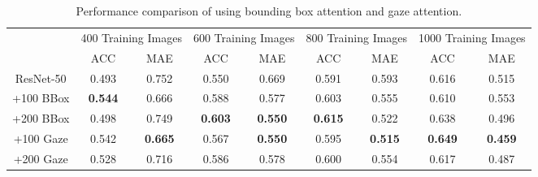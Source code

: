 \begin{table*}[h!]
\caption{Performance comparison of using bounding box attention and gaze attention.}
\label{bbox_table}
\centering
\begin{tabular}{ccccccccc}
\hline
\multirow{2}{*}{} & \multicolumn{2}{c}{400 Training Images}  & \multicolumn{2}{c}{600 Training Images} & \multicolumn{2}{c}{800 Training Images}  & \multicolumn{2}{c}{1000 Training Images} \\ \cline{2-9} 
                        & ACC       & MAE            & ACC       & MAE           & ACC       & MAE            & ACC       & MAE            \\ \hline
ResNet-50               & 0.493          & 0.752          & 0.550          & 0.669         & 0.591          & 0.593          & 0.616          & 0.515          \\ \hline
+100 BBox                & \textbf{0.544} & 0.666          & 0.588          & 0.577         & 0.603          & 0.555          & 0.610           & 0.553          \\ \hline
+200 BBox                & 0.498          & 0.749          & \textbf{0.603} & \textbf{0.550} & \textbf{0.615} & 0.522 & 0.638          & 0.496          \\ \hline
+100 Gaze                  & 0.542          & \textbf{0.665} & 0.567          & \textbf{0.550}         & 0.595          & \textbf{0.515}          & \textbf{0.649}          & \textbf{0.459}         \\ \hline
+200 Gaze                  & 0.528          & 0.716          & 0.586          & 0.578         & 0.600          & 0.554          & 0.617 & 0.487 \\ \hline
\end{tabular}
\end{table*}